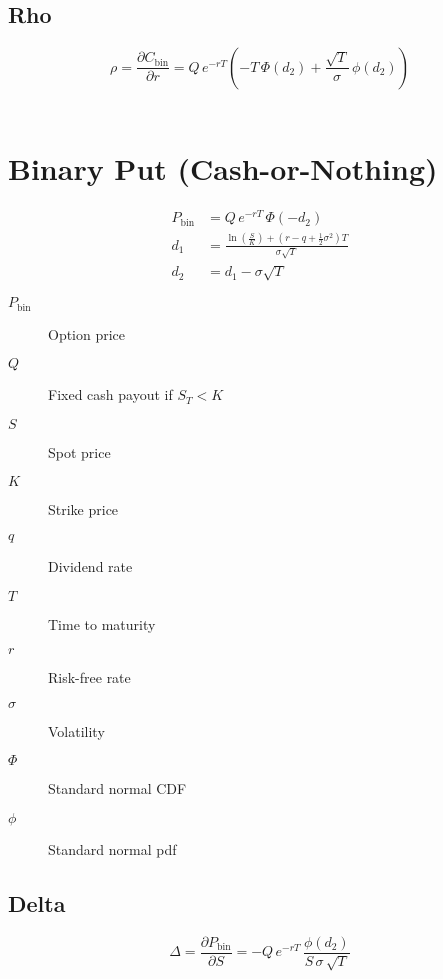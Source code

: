 \documentclass[12pt,a4paper]{article}
\begin{document}
\[
  \begin{aligned}
  \end{aligned}
\]

\subsection{Rho}
\[
  \boxed{\rho = \frac{\partial C_{\mathrm{bin}}}{\partial r}
  = Q\, e^{-rT}\!\left(
    -T\,\Phi(d_2)
    + \frac{\sqrt{T}}{\sigma}\,\phi(d_2)
  \right)}
\]

\[
  \begin{aligned}
  \end{aligned}
\]

\newpage

\section{Binary Put (Cash-or-Nothing)}

\[
  \begin{aligned}
    P_{\mathrm{bin}} & = Q \, e^{-rT} \,\Phi(-d_2) \\ 
    d_1 & = \frac{\ln\!\left(\tfrac{S}{K}\right) + (r - q + \tfrac{1}{2}\sigma^2)T}{\sigma \sqrt{T}} \\
    d_2 & = d_1 - \sigma \sqrt{T}
  \end{aligned}
\]

\begin{description}
  \item[$P_{\mathrm{bin}}$] Option price
  \item[$Q$] Fixed cash payout if \( S_T < K \)
  \item[$S$] Spot price
  \item[$K$] Strike price
  \item[$q$] Dividend rate
  \item[$T$] Time to maturity
  \item[$r$] Risk-free rate
  \item[$\sigma$] Volatility
  \item[$\Phi$] Standard normal CDF
  \item[$\phi$] Standard normal pdf
\end{description}

\subsection{Delta}
\[
  \boxed{\Delta = \frac{\partial P_{\mathrm{bin}}}{\partial S}
  = -Q\, e^{-rT}\, \frac{\phi(d_2)}{S\,\sigma\,\sqrt{T}}}
\]
\end{document}
